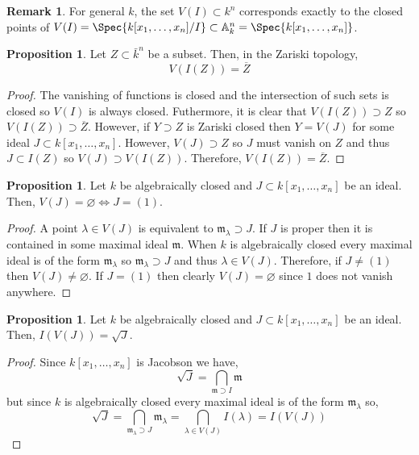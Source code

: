 \documentclass[12pt]{extarticle}
\theoremstyle{definition}
\newtheorem{proposition}[theorem]{Proposition}
\newtheorem{remark}{Remark}
\newcommand{\m}{\mathfrak{m}}
\newcommand{\A}{\mathbb{A}}
\begin{document}
\begin{remark}
For general $k$, the set $V(I) \subset k^n$ corresponds exactly to the closed points of $V(I) = \Spec{k[x_1, \dots, x_n]/I} \subset \A^n_k = \Spec{k[x_1, \dots, x_n]}$. 
\end{remark}

\begin{proposition}
Let $Z \subset \bar{k}^n$ be a subset. Then, in the Zariski topology,
\[ V(I(Z)) = \overline{Z} \]
\end{proposition}

\begin{proof}
The vanishing of functions is closed and the intersection of such sets is closed so $V(I)$ is always closed. Futhermore, it is clear that $V(I(Z)) \supset Z$ so $V(I(Z)) \supset \overline{Z}$. However, if $Y \supset Z$ is Zariski closed then $Y = V(J)$ for some ideal $J \subset k[x_1, \dots, x_n]$. However, $V(J) \supset Z$ so $J$ must vanish on $Z$ and thus $J \subset I(Z)$ so $V(J) \supset V(I(Z))$. Therefore, $V(I(Z)) = \overline{Z}$. 
\end{proof}

\begin{proposition}
Let $k$ be algebraically closed and $J \subset k[x_1,\dots, x_n]$ be an ideal. Then, $V(J) = \varnothing \iff J = (1)$. 
\end{proposition}

\begin{proof}
A point $\lambda \in V(J)$ is equivalent to $\m_\lambda \supset J$. If $J$ is proper then it is contained in some maximal ideal $\m$. When $k$ is algebraically closed every maximal ideal is of the form $\m_\lambda$ so $\m_\lambda \supset J$ and thus $\lambda \in V(J)$. Therefore, if $J \neq (1)$ then $V(J) \neq \varnothing$. If $J = (1)$ then clearly $V(J) = \varnothing$ since $1$ does not vanish anywhere.
\end{proof}

\begin{proposition}
Let $k$ be algebraically closed and $J \subset k[x_1,\dots, x_n]$ be an ideal. Then, $I(V(J)) = \sqrt{J}$. 
\end{proposition}

\begin{proof}
Since $k[x_1, \dots, x_n]$ is Jacobson we have,
\[ \sqrt{J} = \bigcap_{\m \supset I} \m \]
but since $k$ is algebraically closed every maximal ideal is of the form $\m_\lambda$ so,
\[ \sqrt{J} = \bigcap_{\m_\lambda \supset J} \m_\lambda = \bigcap_{\lambda \in V(J)} I(\lambda) = I(V(J)) \]
\end{proof}
\end{document}
